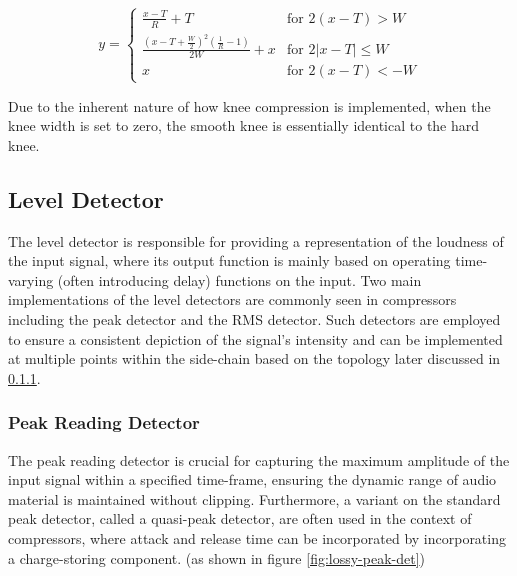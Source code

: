 \documentclass[10pt]{article}
\begin{document}
\begin{multicols*}{2}
                    \begin{equation}
                        y=
                        \begin{cases}
                            \frac{x-T}{R}+T & \text{for $2(x-T)>W$}\\[5pt]
                            \frac{(x-T+\frac{W}{2})^2(\frac{1}{R}-1)}{2W}+x & \text{for $2\left\lvert x-T\right\rvert\leq W$}\\[5pt]
                            x & \text{for $2(x-T)<-W$}
                        \end{cases}
                        \label{eq:gain-comp}
                    \end{equation}

                \noindent Due to the inherent nature of how knee compression is implemented, when the knee width is set to zero, the smooth knee is essentially identical to the hard knee.
            
            \subsection{Level Detector} \label{sect:lvl-det}
                The level detector is responsible for providing a representation of the loudness of the input signal, where its output function is mainly based on operating time-varying (often introducing delay) functions on the input. Two main implementations of the level detectors are commonly seen in compressors including the peak detector and the RMS detector. Such detectors are employed to ensure a consistent depiction of the signal's intensity and can be implemented at multiple points within the side-chain based on the topology later discussed in \ref{}.
                
                \subsubsection{Peak Reading Detector}
                    The peak reading detector is crucial for capturing the maximum amplitude of the input signal within a specified time-frame, ensuring the dynamic range of audio material is maintained without clipping. Furthermore, a variant on the standard peak detector, called a quasi-peak detector, are often used in the context of compressors, where attack and release time can be incorporated by incorporating a charge-storing component. (as shown in figure \ref{fig:lossy-peak-det})


\end{multicols*}
\end{document}
